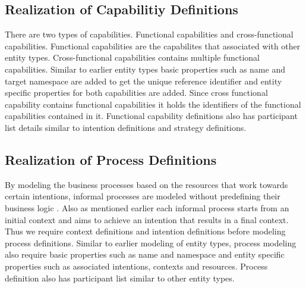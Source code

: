 \subsection{Realization of Capabilitiy Definitions}
There are two types of capabilities. Functional capabilities and cross-functional capabilities. Functional capabilities are the capabilites that associated with other entity types. Cross-functional capabilities contains multiple functional capabilities. Similar to earlier entity types basic properties such as name and target namespace are added to get the unique reference identifier and entity specific properties for both capabilities are added. Since cross functional capability contains functional capabilities it holds the identifiers of the functional capabilities contained in it. Functional capability definitions also has participant list details similar to intention definitions and strategy definitions. 

\subsection{Realization of Process Definitions}
By modeling the business processes based on the resources that work towards certain intentions, informal processes are modeled without predefining their business logic \cite{Sungur2014a}. Also as mentioned earlier each informal process starts from an initial context and aims to achieve an intention that results in a final context. Thus we require context definitions and intention definitions before modeling process definitions. Similar to earlier modeling of entity types, process modeling also require basic properties such as name and namespace  and entity specific properties such as associated intentions, contexts and resources. Process definition also has participant list similar to other entity types. 

